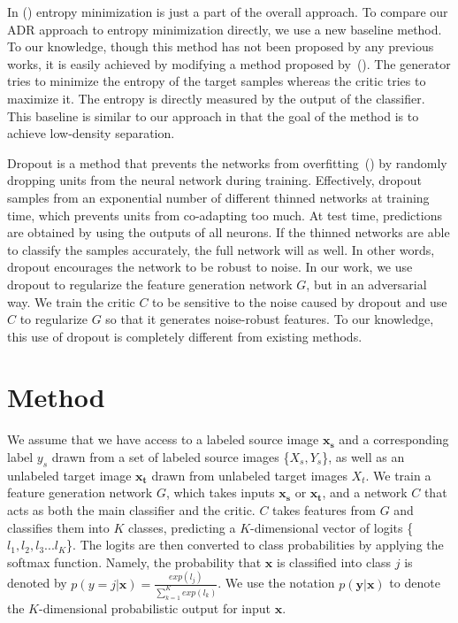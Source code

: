 \documentclass{article} \usepackage{iclr2018_conference,times}
\begin{document}
In (\cite{long2016unsupervised}) entropy minimization is just a part of the overall approach. To compare our ADR approach to entropy minimization directly, we use a new baseline method. To our knowledge, though this method has not been proposed by any previous works, it is easily achieved by modifying a method proposed by~(\cite{springenberg2015unsupervised}). The generator tries to minimize the entropy of the target samples whereas the critic tries to maximize it. The entropy is directly measured by the output of the classifier. This baseline is similar to our approach in that the goal of the method is to achieve low-density separation. 


 Dropout is a method that prevents the networks from overfitting~(\cite{srivastava2014dropout}) by randomly dropping units from the neural network during training. Effectively, dropout samples from an exponential number of different thinned networks at training time, which prevents units from co-adapting too much. At test time, predictions are obtained by using the outputs of all neurons. If the thinned networks are able to classify the samples accurately, the full network will as well. In other words, dropout encourages the network to be robust to noise. In our work, we use dropout to regularize the feature generation network $G$, but in an adversarial way. We train the critic $C$ to be sensitive to the noise caused by dropout and use $C$ to regularize $G$ so that it generates noise-robust features. To our knowledge, this use of dropout is completely different from existing methods.

\section{Method}\label{sec:method}
\vspace{-3mm}        
We assume that we have access to a labeled source image $\mathbf{x_{s}}$ and a corresponding label $y_{s}$ drawn from a set of labeled source images \{$X_{s},Y_{s}$\},
as well as an unlabeled target image $\mathbf{x_{t}}$ drawn from unlabeled target images $X_{t}$. 
We train a feature generation network $G$, which takes inputs $\mathbf{x_{s}}$ or $\mathbf{x_{t}}$, and a network $C$ that acts as both the main classifier and the critic. $C$ takes features from $G$ and classifies them into $K$ classes, predicting a $K$-dimensional vector of logits \{$l_{1},l_{2},l_{3}...l_{K}$\}. The logits are then converted to class probabilities by applying the softmax function. Namely, the probability that $\mathbf{x}$ is classified into class $j$ is denoted by $p(y=j|{\mathbf{x}})=\frac{exp(l_{j})}{\sum_{k=1}^{K}exp(l_{k})}$. We use the notation $p(\mathbf{y}|\mathbf{x})$ to denote the $K$-dimensional probabilistic output for input $\mathbf{x}$.
\end{document}
